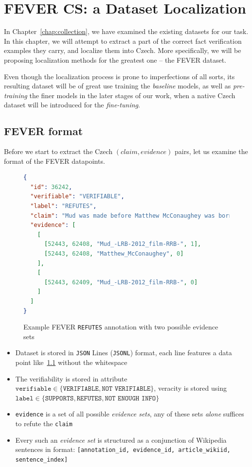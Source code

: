 

\chapter{FEVER CS: a Dataset Localization}
\label{chap:fever_cs}
In Chapter~\ref{chap:collection}, we have examined the existing datasets for our task. In this chapter, we will attempt to extract a part of the correct fact verification examples they carry, and localize them into Czech. More specifically, we will be proposing localization methods for the greatest one -- the \textsf{FEVER} dataset.

Even though the localization process is prone to imperfections of all sorts, its resulting dataset will be of great use training the \textit{baseline} models, as well as \textit{pre-training} the finer models in the later stages of our work, when a native Czech dataset will be introduced for the \textit{fine-tuning}.
\section{FEVER format}
Before we start to extract the Czech $(claim,evidence)$ pairs, let us examine the format of the \textsf{FEVER} datapoints.

\begin{figure}[H]
\begin{lstlisting}[language=json]
{
  "id": 36242,
  "verifiable": "VERIFIABLE",
  "label": "REFUTES",
  "claim": "Mud was made before Matthew McConaughey was born.",
  "evidence": [
    [
      [52443, 62408, "Mud_-LRB-2012_film-RRB-", 1],
      [52443, 62408, "Matthew_McConaughey", 0]
    ],
    [
      [52443, 62409, "Mud_-LRB-2012_film-RRB-", 0]
    ]
  ]
}
\end{lstlisting}
    \caption{Example \textsf{FEVER} \texttt{REFUTES} annotation with two possible evidence sets}
    \label{list:fever}
\end{figure}

\begin{itemize}
    \item Dataset is stored in \texttt{JSON} Lines (\texttt{JSONL}) format, each line features a data point like~\ref{list:fever} without the whitespace
    \item The verifiability is stored in attribute $\texttt{verifiable}\in\{\texttt{VERIFIABLE},\texttt{NOT VERIFIABLE}\}$, veracity is stored using $\texttt{label}\in\{\texttt{SUPPORTS},\texttt{REFUTES},\texttt{NOT ENOUGH INFO}\}$ 
    \item \texttt{evidence} is a set of all possible \textit{evidence sets}, any of these sets \textit{alone} suffices to refute the \texttt{claim}
    \item Every such an \textit{evidence set} is structured as a conjunction of \textsf{Wikipedia} sentences in format: \texttt{[annotation\_id, evidence\_id, article\_wikiid, sentence\_index]}
    
\end{itemize}

